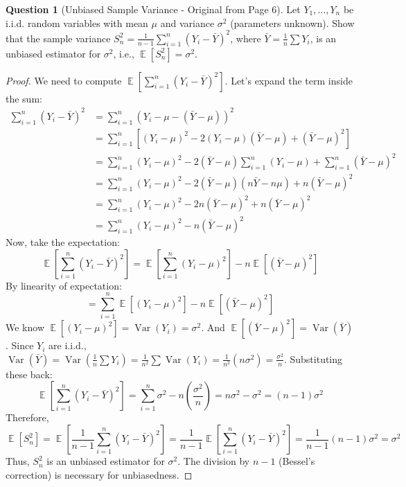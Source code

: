 \documentclass[11pt, a4paper]{article}
\DeclareMathOperator{\E}{\mathbb{E}}             %
\DeclareMathOperator{\Var}{\mathrm{Var}}         %
\theoremstyle{definition}
\newtheorem{question}[theorem]{Question} %
\theoremstyle{remark}
\begin{document}
\begin{question}[Unbiased Sample Variance - Original from Page 6]
Let $Y_1, \dots, Y_n$ be i.i.d. random variables with mean $\mu$ and variance $\sigma^2$ (parameters unknown). Show that the sample variance $S_n^2 = \frac{1}{n-1} \sum_{i=1}^n (Y_i - \bar{Y})^2$, where $\bar{Y} = \frac{1}{n}\sum Y_i$, is an unbiased estimator for $\sigma^2$, i.e., $\E[S_n^2] = \sigma^2$.
\end{question}

\begin{proof}
We need to compute $\E[\sum_{i=1}^n (Y_i - \bar{Y})^2]$. Let's expand the term inside the sum:
\begin{align*} \sum_{i=1}^n (Y_i - \bar{Y})^2 &= \sum_{i=1}^n (Y_i - \mu - (\bar{Y} - \mu))^2 \\ &= \sum_{i=1}^n [ (Y_i - \mu)^2 - 2(Y_i - \mu)(\bar{Y} - \mu) + (\bar{Y} - \mu)^2 ] \\ &= \sum_{i=1}^n (Y_i - \mu)^2 - 2(\bar{Y} - \mu) \sum_{i=1}^n (Y_i - \mu) + \sum_{i=1}^n (\bar{Y} - \mu)^2 \\ &= \sum_{i=1}^n (Y_i - \mu)^2 - 2(\bar{Y} - \mu) (n\bar{Y} - n\mu) + n(\bar{Y} - \mu)^2 \\ &= \sum_{i=1}^n (Y_i - \mu)^2 - 2n(\bar{Y} - \mu)^2 + n(\bar{Y} - \mu)^2 \\ &= \sum_{i=1}^n (Y_i - \mu)^2 - n(\bar{Y} - \mu)^2 \end{align*}
Now, take the expectation:
\[ \E\left[ \sum_{i=1}^n (Y_i - \bar{Y})^2 \right] = \E\left[ \sum_{i=1}^n (Y_i - \mu)^2 \right] - n \E\left[ (\bar{Y} - \mu)^2 \right] \]
By linearity of expectation:
\[ = \sum_{i=1}^n \E[(Y_i - \mu)^2] - n \E[(\bar{Y} - \mu)^2] \]
We know $\E[(Y_i - \mu)^2] = \Var(Y_i) = \sigma^2$.
And $\E[(\bar{Y} - \mu)^2] = \Var(\bar{Y})$. Since $Y_i$ are i.i.d., $\Var(\bar{Y}) = \Var(\frac{1}{n}\sum Y_i) = \frac{1}{n^2} \sum \Var(Y_i) = \frac{1}{n^2} (n \sigma^2) = \frac{\sigma^2}{n}$.
Substituting these back:
\[ \E\left[ \sum_{i=1}^n (Y_i - \bar{Y})^2 \right] = \sum_{i=1}^n \sigma^2 - n \left( \frac{\sigma^2}{n} \right) = n\sigma^2 - \sigma^2 = (n-1)\sigma^2 \]
Therefore,
\[ \E[S_n^2] = \E\left[ \frac{1}{n-1} \sum_{i=1}^n (Y_i - \bar{Y})^2 \right] = \frac{1}{n-1} \E\left[ \sum_{i=1}^n (Y_i - \bar{Y})^2 \right] = \frac{1}{n-1} (n-1)\sigma^2 = \sigma^2 \]
Thus, $S_n^2$ is an unbiased estimator for $\sigma^2$. The division by $n-1$ (Bessel's correction) is necessary for unbiasedness.
\end{proof}
\end{document}
